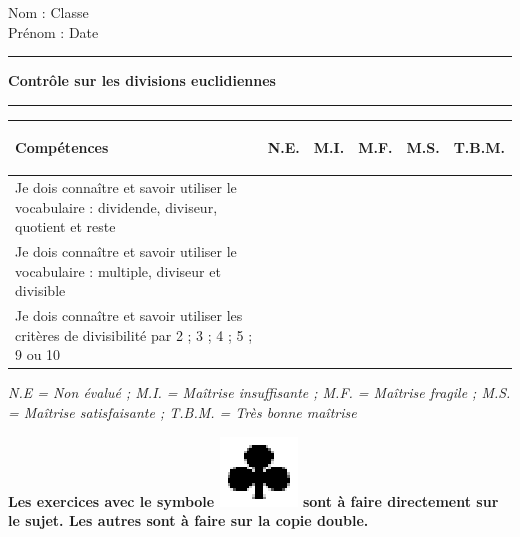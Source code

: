 \documentclass[a4paper,11pt]{article}
\newcommand{\titre}[5] 
{
\noindent #2 \hfill #4 \\
#3 \hfill #5

\vspace{-1.6cm}

\begin{center}\rule{6cm}{0.5mm}\end{center}
\vspace{0.2cm}
\begin{center}{\large{\textbf{#1}}}\end{center}
\begin{center}\rule{6cm}{0.5mm}\end{center}
}
\begin{document}
\pagestyle{empty}
\titre{Contrôle sur les divisions euclidiennes }{Nom :}{Prénom :}{Classe}{Date}


\vspace*{0.5cm}
\begin{flushleft}
\begin{tabular}{|m{9.5cm}|m{1.25cm}|m{1.25cm}|m{1.25cm}|m{1.25cm}|m{1.25cm}|}
\hline 
\textbf{Compétences} & \begin{center}
\textbf{N.E.}
\end{center} & \begin{center}
\textbf{M.I.}
\end{center} & \begin{center}
\textbf{M.F.}
\end{center}  & \begin{center}
\textbf{M.S.}
\end{center} & \begin{center}
\textbf{T.B.M.}
\end{center} \\ 
\hline 
Je dois connaître et savoir utiliser le vocabulaire : dividende, diviseur, quotient et reste & & &  & &\\
\hline
Je dois connaître et savoir utiliser le vocabulaire : multiple, diviseur et divisible& & &  & & \\ 
\hline
Je dois connaître et savoir utiliser les critères de divisibilité par 2 ; 3 ; 4 ; 5 ; 9 ou 10 & & &  & & \\ 
\hline 


\end{tabular}  
\end{flushleft}

\textit{N.E = Non évalué ; M.I. = Maîtrise insuffisante ; M.F. = Maîtrise fragile ; M.S. = Maîtrise satisfaisante ; T.B.M. = Très bonne maîtrise}\\



\vspace*{0.15cm}


\textbf{Les exercices avec le symbole \includegraphics[scale=0.4]{trefle.eps} sont à faire directement sur le sujet. Les autres sont à faire sur la copie double.}\\
\end{document}
